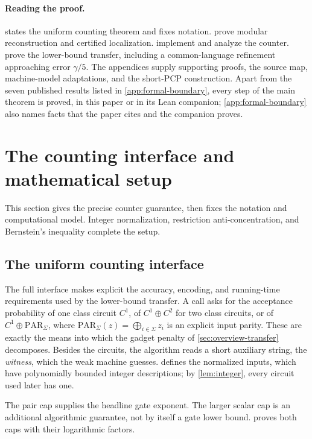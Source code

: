 \documentclass[11pt,letterpaper]{article}
\theoremstyle{definition}
\theoremstyle{remark}
\newcommand{\PAR}{\mathrm{PAR}}
\begin{document}
\paragraph{Reading the proof.}
 states the uniform counting theorem and fixes
notation.  prove modular reconstruction
and certified localization. 
implement and analyze the counter. 
prove the lower-bound transfer, including a common-language refinement
approaching error \(\gamma/5\). The appendices supply supporting
proofs, the source map, machine-model adaptations, and the short-PCP
construction. Apart from the seven published results listed in
\cref{app:formal-boundary}, every step of the main theorem is proved,
in this paper or in its Lean companion; \cref{app:formal-boundary} also
names facts that the paper cites and the companion proves.

\section{The counting interface and mathematical setup}\label{sec:prelim}

This section gives the precise counter guarantee, then fixes the
notation and computational model. Integer normalization, restriction
anti-concentration, and Bernstein's inequality complete the setup.

\subsection{The uniform counting interface}\label{sec:counting-interface}
The full interface makes explicit the accuracy, encoding, and running-time
requirements used by the lower-bound transfer. A call asks for
the acceptance probability of one class circuit \(C^1\), of
\(C^1\oplus C^2\) for two class circuits, or of \(C^1\oplus\PAR_\Sigma\),
where \(\PAR_\Sigma(z)=\bigoplus_{i\in\Sigma}z_i\) is an explicit input parity.
These are exactly the means into which the gadget penalty of
\cref{sec:overview-transfer} decomposes.
Besides the circuits, the algorithm reads a short auxiliary string,
the \emph{witness}, which the weak machine guesses.
 defines the normalized inputs, which have
polynomially bounded integer descriptions; by \cref{lem:integer},
every circuit used later has one.

The pair cap supplies the headline gate exponent. The larger scalar cap
is an additional algorithmic guarantee, not by itself a gate lower bound.
 proves both caps with their logarithmic factors.
\end{document}
